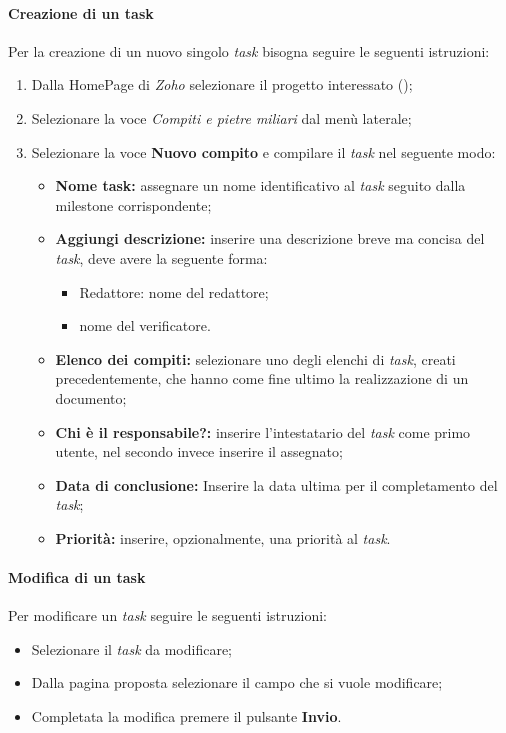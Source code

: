 \paragraph{Creazione di un task}
Per la creazione di un nuovo singolo \textit{task} bisogna seguire le seguenti 
istruzioni:
\begin{enumerate}
  \item Dalla HomePage di \textit{Zoho} selezionare il progetto interessato (\progetto);
  \item Selezionare la voce \textsl{Compiti e pietre miliari} dal menù laterale;
  \item Selezionare la voce \textbf{Nuovo compito} e compilare il \textit{task} nel 
  seguente modo:
    \begin{itemize}
      \item \textbf{Nome task:} assegnare un nome identificativo al \textit{task} seguito dalla milestone corrispondente;
      \item \textbf{Aggiungi descrizione:} inserire una descrizione breve ma 
      concisa del \textit{task}, deve avere la seguente forma:
        \begin{itemize}
          \item Redattore: nome del redattore;
          \item \textit{\Ver} nome del verificatore.
        \end{itemize}
      \item \textbf{Elenco dei compiti:} selezionare uno degli elenchi di 
      \textit{task}, creati precedentemente, che hanno come fine ultimo la realizzazione di un 
      documento;
      \item \textbf{Chi è il responsabile?:} inserire l'intestatario del \textit{task} 
      come primo utente, nel secondo invece inserire il \textit{\Ver} assegnato;
      \item \textbf{Data di conclusione:} Inserire la data ultima per il 
      completamento del \textit{task};
     \item \textbf{Priorità:} inserire, opzionalmente, una priorità al \textit{task}.
    \end{itemize}
\end{enumerate}


\paragraph{Modifica di un task}
Per modificare un \textit{task} seguire le seguenti istruzioni:
\begin{itemize}
  \item Selezionare il \textit{task} da modificare;
  \item Dalla pagina proposta selezionare il campo che si vuole modificare;
  \item Completata la modifica premere il pulsante \textbf{Invio}.
\end{itemize}

